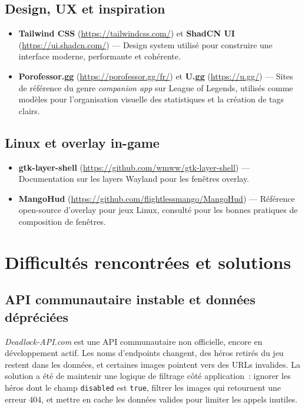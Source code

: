 \documentclass[12pt,a4paper]{article}
\begin{document}
\subsection{Design, UX et inspiration}

\begin{itemize}
  \item \textbf{Tailwind CSS}
    (\url{https://tailwindcss.com/}) et \textbf{ShadCN UI}
    (\url{https://ui.shadcn.com/}) --- Design system utilisé pour
    construire une interface moderne, performante et cohérente.

  \item \textbf{Porofessor.gg}
    (\url{https://porofessor.gg/fr/}) et \textbf{U.gg}
    (\url{https://u.gg/}) --- Sites de référence du genre
    \textit{companion app} sur League of Legends, utilisés comme modèles
    pour l'organisation visuelle des statistiques et la création de
    tags clairs.
\end{itemize}

\subsection{Linux et overlay in-game}

\begin{itemize}
  \item \textbf{gtk-layer-shell}
    (\url{https://github.com/wmww/gtk-layer-shell}) --- Documentation
    sur les layers Wayland pour les fenêtres overlay.

  \item \textbf{MangoHud}
    (\url{https://github.com/flightlessmango/MangoHud}) --- Référence
    open-source d'overlay pour jeux Linux, consulté pour les bonnes
    pratiques de composition de fenêtres.
\end{itemize}

\section{Difficultés rencontrées et solutions}

\subsection{API communautaire instable et données dépréciées}

\textit{Deadlock-API.com} est une API communautaire non officielle, encore
en développement actif. Les noms d'endpoints changent, des héros retirés
du jeu restent dans les données, et certaines images pointent vers des URLs
invalides. La solution a été de maintenir une logique de filtrage côté
application~: ignorer les héros dont le champ \texttt{disabled} est
\texttt{true}, filtrer les images qui retournent une erreur 404, et mettre
en cache les données valides pour limiter les appels inutiles.
\end{document}
